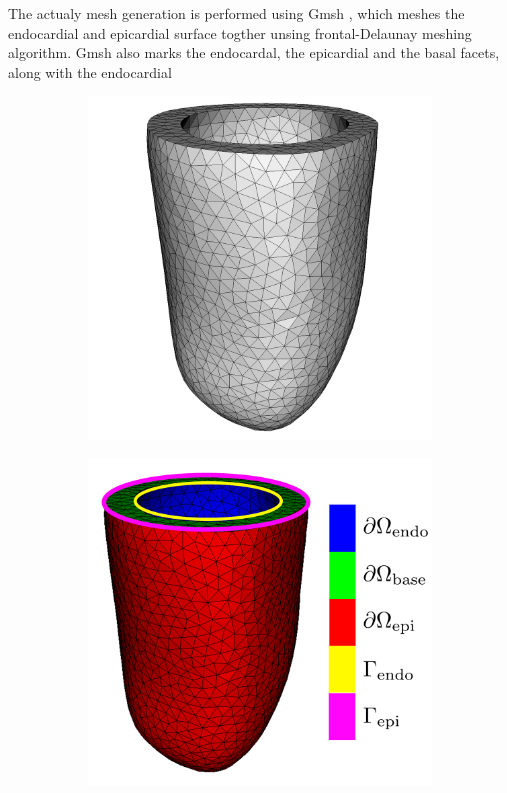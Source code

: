 


The actualy mesh generation is performed using Gmsh
\cite{geuzaine2009gmsh}, which meshes the endocardial and epicardial
surface togther unsing frontal-Delaunay meshing algorithm. Gmsh also marks
the endocardal, the epicardial  and the basal facets, along with the
endocardial 

\begin{figure}[htbp]
  \centering
  \begin{subfigure}[t]{0.4\textwidth}
    \includegraphics[width=\textwidth]{chapters/introduction/figures/geometry/mesh.png}
    \caption{\label{fig:mesh}}
  \end{subfigure}
  \begin{subfigure}[t]{0.45\textwidth}
    \includegraphics[width=\textwidth]{chapters/introduction/figures/geometry/markers_full.pdf}

\end{subfigure}
\end{figure}
